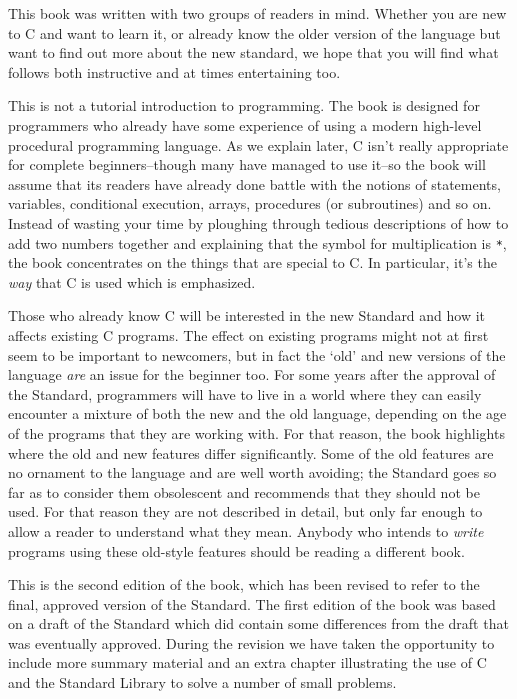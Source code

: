 

  

  This book was written with two groups of readers in mind. Whether you are
   new to C and want to learn it, or already know the older version of the
   language but want to find out more about the new standard, we hope that you
   will find what follows both instructive and at times entertaining too.


  This is not a tutorial introduction to programming. The book is designed
   for programmers who already have some experience of using a modern
   high-level procedural programming language. As we explain later,
   C isn't really appropriate for complete beginners--though many
   have managed to use it--so the book will assume that its readers have
   already done battle with the notions of statements, variables, conditional
   execution, arrays, procedures (or subroutines) and so on. Instead of
   wasting your time by ploughing through tedious descriptions of how to add
   two numbers together and explaining that the symbol for multiplication
   is \texttt{*}, the book concentrates on the things that are
   special to C. In particular, it's the \textit{way} that C is used
   which is emphasized.


  Those who already know C will be interested in the new Standard and how
   it affects existing C programs. The effect on existing programs might not
   at first seem to be important to newcomers, but in fact the `old' and
   new versions of the language \textit{are} an issue for the beginner too.
   For some years after the approval of the Standard, programmers will have to
   live in a world where they can easily encounter a mixture of both the new
   and the old language, depending on the age of the programs that they are
   working with. For that reason, the book highlights where the old and new
   features differ significantly. Some of the old features are no ornament to
   the language and are well worth avoiding; the Standard goes so far as to
   consider them obsolescent and recommends that they should not be used. For
   that reason they are not described in detail, but only far enough to allow
   a reader to understand what they mean. Anybody who intends to
   \textit{write} programs using these old-style features should be reading a
   different book.


  This is the second edition of the book, which has been revised to refer
   to the final, approved version of the Standard. The first edition of the
   book was based on a draft of the Standard which did contain some
   differences from the draft that was eventually approved. During the
   revision we have taken the opportunity to include more summary material and
   an extra chapter illustrating the use of C and the Standard Library to
   solve a number of small problems.


